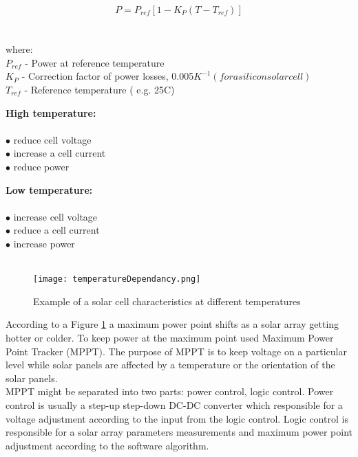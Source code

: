 \begin{equation}
P = P_{ref} [ 1 - K_{P} ( T - T_{ref}) ]
\end{equation}
	\\
	\\
where:\\
     $P_{ref}$ - Power at reference temperature\\
     $K_{P}$ - Correction factor of power losses, 0.005$K^{-1}(for a silicon solar cell)$\\
     $T_{ref}$ - Reference temperature ( e.g. 25\textdegree{}C)\\
     
     

\begin{multicols}{2}
	\textbf{High  temperature:} \\ \\
	$\bullet$ reduce cell voltage \\
	$\bullet$ increase a cell current\\
	$\bullet$ reduce power\\
	

	\columnbreak
	
	\textbf{Low temperature:}\\ \\
	$\bullet$ increase cell voltage\\
	$\bullet$ reduce a cell current\\
	$\bullet$ increase power\\
	\\
\end{multicols}


	\begin{figure}[h]
		\centering
		\texttt{[image: temperatureDependancy.png]}
		\caption{ Example of a solar cell characteristics at different temperatures\cite{6} }
		\label{fig: EPS11}
	\end{figure}
	
According to a Figure \ref{fig: EPS11} a maximum power point shifts as a solar array getting hotter or colder. To keep power at the maximum point used Maximum Power Point Tracker (MPPT). The purpose of MPPT is to keep voltage on a particular level while solar panels are affected by a temperature or the orientation of the solar panels.\\
\cite{20} MPPT might be separated into two parts: power control, logic control. Power control is usually a step-up step-down DC-DC  converter which responsible for a voltage adjustment according to the input from the logic control. Logic control is responsible for a solar array parameters measurements and maximum power point adjustment according to the software algorithm.\\  

